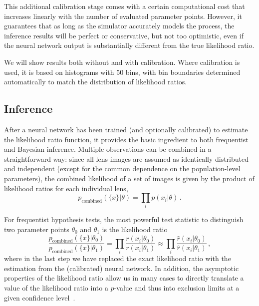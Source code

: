 \documentclass[twocolumn]{aastex63}
\begin{document}
This additional calibration stage comes with a certain computational cost that increases linearly with the number of evaluated parameter points. However, it guarantees that as long as the simulator accurately models the process, the inference results will be perfect or conservative, but not too optimistic, even if the neural network output is substantially different from the true likelihood ratio.

We will show results both without and with calibration. Where calibration is used, it is based on histograms with 50 bins, with bin boundaries determined automatically to match the distribution of likelihood ratios.


\subsection{Inference}
\label{sec:lfi-inference}

After a neural network has been trained (and optionally calibrated) to estimate the likelihood ratio function, it provides the basic ingredient to both frequentist and Bayesian inference. Multiple observations can be combined in a straightforward way: since all lens images are assumed as identically distributed and independent (except for the common dependence on the population-level parameters), the combined likelihood of a set of images is given by the product of likelihood ratios for each individual lens,
%
\begin{equation}
  p_\mathrm{combined}(\{x\}|\theta) = \prod_{i} p(x_i | \theta) \,.
\end{equation}

For frequentist hypothesis tests, the most powerful test statistic to distinguish two parameter points $\theta_0$ and $\theta_1$ is the likelihood ratio~\citep{1933RSPTA.231..289N}
%
\begin{equation}
    \frac{p_\mathrm{combined}(\{x\}|\theta_0)}{p_\mathrm{combined}(\{x\}|\theta_1)} = \prod_{i} \frac{r(x_i | \theta_0)}{r(x_i | \theta_1)} \approx \prod_{i} \frac{\hat{r}(x_i | \theta_0)}{\hat{r}(x_i | \theta_1)} \,,
\end{equation}
%
where in the last step we have replaced the exact likelihood ratio with the estimation from the (calibrated) neural network. In addition, the asymptotic properties of the likelihood ratio allow us in many cases to directly translate a value of the likelihood ratio into a $p$-value and thus into exclusion limits at a given confidence level~\citep{Wilks:1938dza, Wald, Cowan:2010js}.
\end{document}
